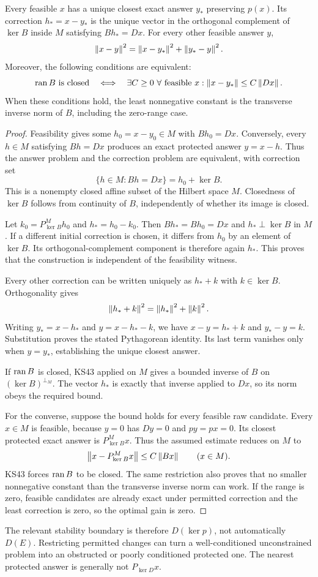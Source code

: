 \begin{theorem}\label{KS56}
Every feasible \(x\) has a unique closest exact answer \(y_*\) preserving \(p(x)\). Its correction \(h_*=x-y_*\) is the unique vector in the orthogonal complement of \(\ker B\) inside \(M\) satisfying \(Bh_*=Dx\). For every other feasible answer \(y\),
\[
 \left\lVert x-y\right\rVert^2=\left\lVert x-y_*\right\rVert^2+\left\lVert y_*-y\right\rVert^2.
\]
Moreover, the following conditions are equivalent:
\[
 \operatorname{ran} B\text{ is closed}
 \quad\Longleftrightarrow\quad
 \exists C\ge0\ \forall\text{ feasible }x:
 \left\lVert x-y_*\right\rVert\le C\left\lVert Dx\right\rVert.
\]
When these conditions hold, the least nonnegative constant is the transverse inverse norm of \(B\), including the zero-range case.
\end{theorem}
\begin{proof}
Feasibility gives some $h_0=x-y_0\in M$ with $Bh_0=Dx$. Conversely, every $h\in M$ satisfying $Bh=Dx$ produces an exact protected answer $y=x-h$. Thus the answer problem and the correction problem are equivalent, with correction set
\[
 \{h\in M:Bh=Dx\}=h_0+\ker B.
\]
This is a nonempty closed affine subset of the Hilbert space $M$. Closedness of $\ker B$ follows from continuity of $B$, independently of whether its image is closed.

Let $k_0=P^M_{\ker B}h_0$ and $h_*=h_0-k_0$. Then $Bh_*=Bh_0=Dx$ and $h_*\perp\ker B$ in $M$. If a different initial correction is chosen, it differs from $h_0$ by an element of $\ker B$. Its orthogonal-complement component is therefore again $h_*$. This proves that the construction is independent of the feasibility witness.

Every other correction can be written uniquely as $h_*+k$ with $k\in\ker B$. Orthogonality gives
\[
 \left\lVert h_*+k\right\rVert^2=\left\lVert h_*\right\rVert^2+\left\lVert k\right\rVert^2.
\]
Writing $y_*=x-h_*$ and $y=x-h_*-k$, we have $x-y=h_*+k$ and $y_*-y=k$. Substitution proves the stated Pythagorean identity. Its last term vanishes only when $y=y_*$, establishing the unique closest answer.

If $\operatorname{ran} B$ is closed, KS43 applied on $M$ gives a bounded inverse of $B$ on $(\ker B)^{\perp_M}$. The vector $h_*$ is exactly that inverse applied to $Dx$, so its norm obeys the required bound.

For the converse, suppose the bound holds for every feasible raw candidate. Every $x\in M$ is feasible, because $y=0$ has $Dy=0$ and $py=px=0$. Its closest protected exact answer is $P^M_{\ker B}x$. Thus the assumed estimate reduces on $M$ to
\[
 \left\lVert x-P^M_{\ker B}x\right\rVert\le C\left\lVert Bx\right\rVert\qquad(x\in M).
\]
KS43 forces $\operatorname{ran} B$ to be closed. The same restriction also proves that no smaller nonnegative constant than the transverse inverse norm can work. If the range is zero, feasible candidates are already exact under permitted correction and the least correction is zero, so the optimal gain is zero.
\end{proof}
The relevant stability boundary is therefore \(D(\ker p)\), not automatically \(D(E)\). Restricting permitted changes can turn a well-conditioned unconstrained problem into an obstructed or poorly conditioned protected one. The nearest protected answer is generally not \(P_{\ker D}x\).

